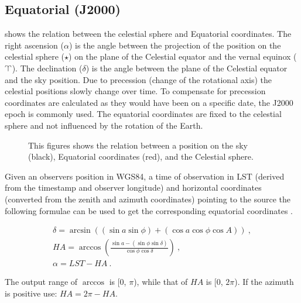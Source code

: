 \subsection{Equatorial (J2000)}

 shows the relation between the celestial sphere
and Equatorial coordinates. The right ascension ($\alpha$) is the angle
between the projection of the position on the celestial sphere ($\star$)
on the plane of the Celestial equator and the vernal equinox
($\vernal$). The declination ($\delta$) is the angle between the plane
of the Celestial equator and the sky position. Due to precession (change
of the rotational axis) the celestial positions slowly change over time.
To compensate for precession coordinates are calculated as they would
have been on a specific date, the J2000 epoch is commonly used. The
equatorial coordinates are fixed to the celestial sphere and not
influenced by the rotation of the Earth.

\begin{figure}
    \centering
    
    \caption{This figures shows the relation between a position on the
             sky (black), Equatorial coordinates (red), and the
             Celestial sphere.}
    \label{fig:equatorial}
\end{figure}

Given an observers position in WGS84, a time of observation in LST
(derived from the \gps timestamp and observer longitude) and horizontal
coordinates (converted from the zenith and azimuth coordinates) pointing
to the source the following formulae can be used to get the
corresponding equatorial coordinates \cite[p. 37]{duffet-smith:1990aa}.

\begin{equation}
    \label{eq:equatorial}
    \begin{array}{l}
        \delta = \arcsin{\left((\sin{a} \sin{\phi}) +
                               (\cos{a} \cos{\phi} \cos{A})\right)} \ , \\
        \mathit{HA} = \arccos{\left(\frac{\sin{a} - (\sin{\phi} \sin{\delta})}
                                         {\cos{\phi} \cos{\delta}}\right)} \ , \\
        \alpha = \mathit{LST} - \mathit{HA} \ .
    \end{array}
\end{equation}

The output range of $\arccos$ is [0, $\pi$), while that of $\mathit{HA}$ is
[0, $2\pi$). If the azimuth is positive use: $\mathit{HA} = 2 \pi -
\mathit{HA}$.

